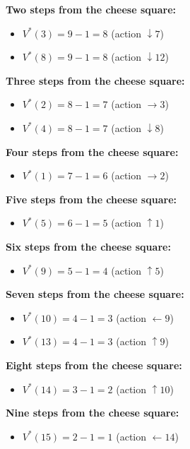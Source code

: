 \documentclass{article}
\begin{document}
\begin{enumerate}[label=(\alph*)]
    \textbf{Two steps from the cheese square:}
    \begin{itemize}
        \item \( V^*(3) = 9 - 1 = 8 \) (action $\downarrow 7$)
        \item \( V^*(8) = 9 - 1 = 8 \) (action $\downarrow 12$)
    \end{itemize}

    \textbf{Three steps from the cheese square:}
    \begin{itemize}
        \item \( V^*(2) = 8 - 1 = 7 \) (action $\rightarrow 3$)
        \item \( V^*(4) = 8 - 1 = 7 \) (action $\downarrow 8$)
    \end{itemize}

    \textbf{Four steps from the cheese square:}
    \begin{itemize}
        \item \( V^*(1) = 7 - 1 = 6 \) (action $\rightarrow 2$)
    \end{itemize}

    \textbf{Five steps from the cheese square:}
    \begin{itemize}
        \item \( V^*(5) = 6 - 1 = 5 \) (action $\uparrow 1$)
    \end{itemize}

    \textbf{Six steps from the cheese square:}
    \begin{itemize}
        \item \( V^*(9) = 5 - 1 = 4 \) (action $\uparrow 5$)
    \end{itemize}

    \textbf{Seven steps from the cheese square:}
    \begin{itemize}
        \item \( V^*(10) = 4 - 1 = 3 \) (action $\leftarrow 9$)
        \item \( V^*(13) = 4 - 1 = 3 \) (action $\uparrow 9$)
    \end{itemize}

    \textbf{Eight steps from the cheese square:}
    \begin{itemize}
        \item \( V^*(14) = 3 - 1 = 2 \) (action $\uparrow 10$)
    \end{itemize}

    \textbf{Nine steps from the cheese square:}
    \begin{itemize}
        \item \( V^*(15) = 2 - 1 = 1 \) (action $\leftarrow 14$)
    \end{itemize}


\end{enumerate}
\end{document}
